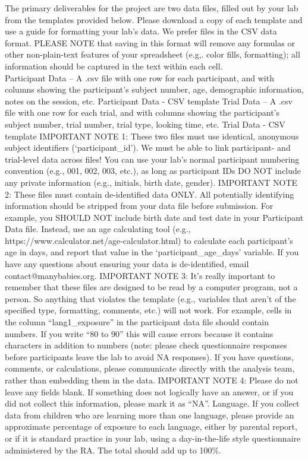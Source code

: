 \documentclass[
  letterpaper,
  DIV=11,
  numbers=noendperiod,
  oneside]{scrreprt}
\begin{document}
The primary deliverables for the project are two data files, filled out
by your lab from the templates provided below. Please download a copy of
each template and use a guide for formatting your lab's data. We prefer
files in the CSV data format. PLEASE NOTE that saving in this format
will remove any formulas or other non-plain-text features of your
spreadsheet (e.g,. color fills, formatting); all information should be
captured in the text within each cell.\\
Participant Data -- A .csv file with one row for each participant, and
with columns showing the participant's subject number, age, demographic
information, notes on the session, etc. Participant Data - CSV template
Trial Data -- A .csv file with one row for each trial, and with columns
showing the participant's subject number, trial number, trial type,
looking time, etc. Trial Data - CSV template IMPORTANT NOTE 1: These two
files must use identical, anonymous subject identifiers
(`participant\_id'). We must be able to link participant- and
trial-level data across files! You can use your lab's normal participant
numbering convention (e.g., 001, 002, 003, etc.), as long as participant
IDs DO NOT include any private information (e.g., initials, birth date,
gender). IMPORTANT NOTE 2: These files must contain de-identified data
ONLY. All potentially identifying information should be stripped from
your data file before submission. For example, you SHOULD NOT include
birth date and test date in your Participant Data file. Instead, use an
age calculating tool (e.g.,
https://www.calculator.net/age-calculator.html) to calculate each
participant's age in days, and report that value in the
`participant\_age\_days' variable. If you have any questions about
ensuring your data is de-identified, email contact@manybabies.org.
IMPORTANT NOTE 3: It's really important to remember that these files are
designed to be read by a computer program, not a person. So anything
that violates the template (e.g., variables that aren't of the specified
type, formatting, comments, etc.) will not work. For example, cells in
the column ``lang1\_exposure'' in the participant data file should
contain numbers. If you write ``80 to 90'' this will cause errors
because it contains characters in addition to numbers (note: please
check questionnaire responses before participants leave the lab to avoid
NA responses). If you have questions, comments, or calculations, please
communicate directly with the analysis team, rather than embedding them
in the data. IMPORTANT NOTE 4: Please do not leave any fields blank. If
something does not logically have an answer, or if you did not collect
this information, please mark it as ``NA''. Language. If you collect
data from children who are learning more than one language, please
provide an approximate percentage of exposure to each language, either
by parental report, or if it is standard practice in your lab, using a
day-in-the-life style questionnaire administered by the RA. The total
should add up to 100\%.
\end{document}
